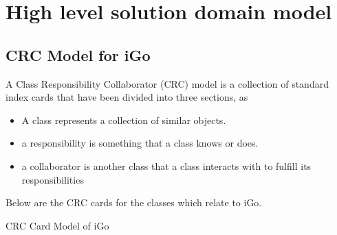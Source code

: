 \documentclass[a4paper,12pt]{article}
\begin{document}
\newcommand{\CC}{C\nolinebreak\hspace{-.05em}\raisebox{.4ex}{\tiny\bf +}\nolinebreak\hspace{-.10em}\raisebox{.4ex}{\tiny\bf +}}
\def\CC{{C\nolinebreak[4]\hspace{-.05em}\raisebox{.4ex}{\tiny\bf ++}}}

\tableofcontents
\newpage
\section{High level solution domain model}
\subsection{CRC Model for iGo}
A Class Responsibility Collaborator (CRC) model is a collection of standard
index cards that have been divided into three sections, as
\begin{itemize}
  \item A class represents a collection of similar objects.
  \item a responsibility is something that a class knows or does.
  \item a collaborator is another class that a class interacts with to fulfill its
responsibilities
\end{itemize}
Below are the CRC cards for the classes which relate to iGo.
\begin{center}
\caption{CRC Card Model of iGo}
\end{center}
\end{document}
